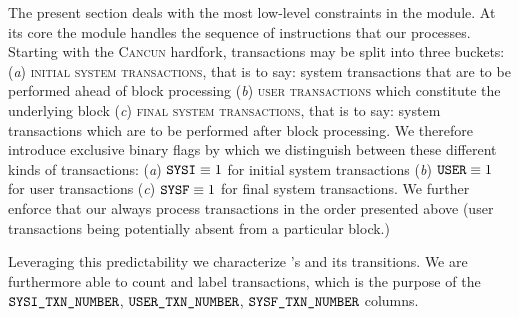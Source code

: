 The present section deals with the most low-level constraints in the \hubMod{} module.
At its core the \hubMod{} module handles the sequence of instructions that our \zkEvm{} processes.
Starting with the \textsc{Cancun} hardfork, \evm{} transactions may be split into three buckets:
(\emph{a}) \textsc{initial system transactions}, that is to say: system transactions that are to be performed ahead of block processing
(\emph{b}) \textsc{user transactions} which constitute the underlying block
(\emph{c}) \textsc{final system transactions}, that is to say: system transactions which are to be performed after block processing.
We therefore introduce exclusive binary flags by which we distinguish between these different kinds of transactions:
(\emph{a}) $\texttt{SYSI} \equiv 1$ for initial system transactions
(\emph{b}) $\texttt{USER} \equiv 1$ for user transactions
(\emph{c}) $\texttt{SYSF} \equiv 1$ for final system transactions.
We further enforce that our \zkEvm{} always process transactions in the order presented above
(user transactions being potentially absent from a particular block.)

Leveraging this predictability we characterize \blockNumber{}'s and its transitions.
We are furthermore able to count and label transactions,
which is the purpose of the
$\texttt{SYSI}\texttt{\_}\texttt{TXN\_NUMBER}$,
$\texttt{USER}\texttt{\_}\texttt{TXN\_NUMBER}$,
$\texttt{SYSF}\texttt{\_}\texttt{TXN\_NUMBER}$
columns.
